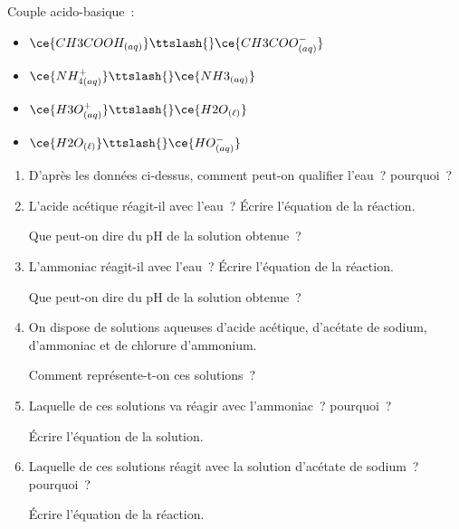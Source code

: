 \begin{donnees}
    Couple acido-basique~:
    \begin{itemize}
      \item $\ce{CH3COOH_{(aq)}}\ttslash{}\ce{CH3COO^{-}_{(aq)}}$
      \item $\ce{NH^{+}_{4(aq)}}\ttslash{}\ce{NH3_{(aq)}}$
      \item $\ce{H3O^{+}_{(aq)}}\ttslash{}\ce{H2O_{(\ell)}}$
      \item $\ce{H2O_{(\ell)}}\ttslash{}\ce{HO^{-}_{(aq)}}$
    \end{itemize}
\end{donnees}

\begin{enumerate}
    \item D'après les données ci-dessus, comment peut-on qualifier l'eau~?
          pourquoi~? 
    \item L'acide acétique réagit-il avec l'eau~? Écrire l'équation de la
          réaction.
    
          Que peut-on dire du pH de la solution obtenue~?
    \item L'ammoniac réagit-il avec l'eau~? Écrire l'équation de la réaction.

          Que peut-on dire du pH de la solution obtenue~?
    \item On dispose de solutions aqueuses d'acide acétique, d'acétate de
          sodium, d'ammoniac et de chlorure d'ammonium.

          Comment représente-t-on ces solutions~? 
    \item Laquelle de ces solutions va réagir avec l'ammoniac~? pourquoi~?

          Écrire l'équation de la solution.
    \item Laquelle de ces solutions réagit avec la solution d'acétate de
          sodium~? pourquoi~?

          Écrire l'équation de la réaction.
\end{enumerate}

